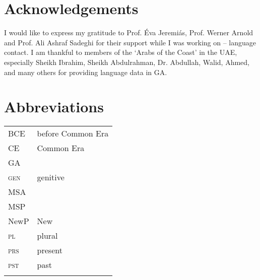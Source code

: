 \documentclass[output=paper]{langsci/langscibook}
\begin{document}
\section*{Acknowledgements}

I would like to express my gratitude to Prof. Éva Jeremiás, Prof. Werner Arnold and Prof. Ali Ashraf Sadeghi for their support while I was working on – language contact. I am thankful to members of the ‘Arabs of the Coast’ in the UAE, especially Sheikh Ibrahim, Sheikh Abdulrahman, Dr. Abdullah, Walid, Ahmed, and many others for providing language data in GA.

\section*{Abbreviations}
\begin{tabularx}{.5\textwidth}{@{}lQ@{}}
BCE & before Common Era\\
CE & Common Era\\
GA &  \\
\textsc{gen}   &  genitive\\
MSA &   \\
MSP  &   \\
NewP   &  New \\
\textsc{pl}   &  plural\\
\textsc{prs}   &  present\\
\textsc{pst}   &  past\\
 &   \\
\end{tabularx}%



{\sloppy\printbibliography[heading=subbibliography,notkeyword=this]}
\end{document}
